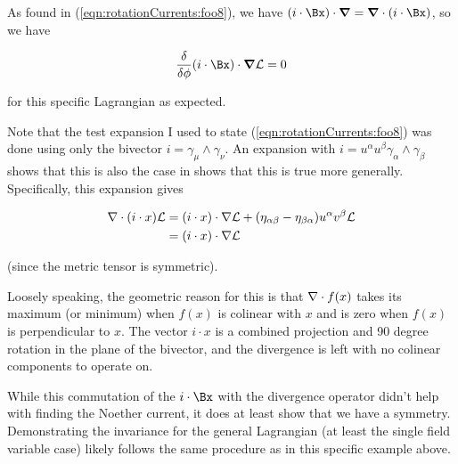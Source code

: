 As found in (\ref{eqn:rotationCurrents:foo8}), we have $(i \cdot \Bx) \cdot \spacegrad = \spacegrad \cdot (i \cdot \Bx)$, so we have

\begin{align}\label{eqn:rotationCurrents:foo15}
\frac{\delta }{\delta \phi} (i \cdot \Bx) \cdot \spacegrad \LL = 0
\end{align}

for this specific Lagrangian as expected.

Note that the test expansion I used to state (\ref{eqn:rotationCurrents:foo8}) was done using only the bivector $i = \gamma_\mu \wedge \gamma_\nu$.  An expansion with $i = u^\alpha u^\beta \gamma_\alpha \wedge \gamma_\beta$ shows that this is also the case in shows that this is true more generally.  Specifically, this expansion gives

\begin{align*}
\nabla \cdot (i \cdot x) \mathcal{L} 
&= (i \cdot x) \cdot \nabla \mathcal{L} + (\eta_{\alpha\beta} - \eta_{\beta\alpha}) u^\alpha v^\beta \mathcal{L} \\
&= (i \cdot x) \cdot \nabla \mathcal{L} 
\end{align*}

(since the metric tensor is symmetric).

Loosely speaking, the geometric reason for this is that $\nabla \cdot f(x)$ takes its maximum (or minimum) when $f(x)$ is colinear with $x$ and is zero when $f(x)$ is perpendicular to $x$.  The vector $i \cdot x$ is a combined projection and 90 degree rotation in the plane of the bivector, and the divergence is left with no colinear components to operate on.

While this commutation of the $i \cdot \Bx$ with the divergence operator didn't help with finding the Noether current, it does at least show that we have a symmetry.  Demonstrating the invariance for the general Lagrangian (at least the single field variable case) likely follows the same procedure as in this specific example above.

\EndArticle
